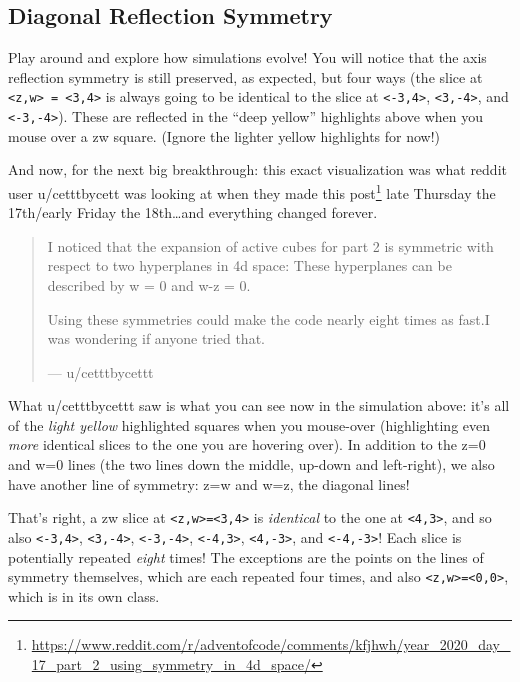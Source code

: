 \documentclass[]{article}
\renewcommand{\href}[2]{#2\footnote{\url{#1}}}
\begin{document}
\hypertarget{diagonal-reflection-symmetry}{%
\subsection{Diagonal Reflection Symmetry}\label{diagonal-reflection-symmetry}}

Play around and explore how simulations evolve! You will notice that the axis
reflection symmetry is still preserved, as expected, but four ways (the slice at
\texttt{\textless{}z,w\textgreater{}\ =\ \textless{}3,4\textgreater{}} is always
going to be identical to the slice at \texttt{\textless{}-3,4\textgreater{}},
\texttt{\textless{}3,-4\textgreater{}}, and
\texttt{\textless{}-3,-4\textgreater{}}). These are reflected in the ``deep
yellow'' highlights above when you mouse over a zw square. (Ignore the lighter
yellow highlights for now!)

And now, for the next big breakthrough: this exact visualization was what reddit
user u/cetttbycett was looking at when
\href{https://www.reddit.com/r/adventofcode/comments/kfjhwh/year_2020_day_17_part_2_using_symmetry_in_4d_space/}{they
made this post} late Thursday the 17th/early Friday the 18th\ldots and
everything changed forever.

\begin{quote}
I noticed that the expansion of active cubes for part 2 is symmetric with
respect to two hyperplanes in 4d space: These hyperplanes can be described by w
= 0 and w-z = 0.

Using these symmetries could make the code nearly eight times as fast.I was
wondering if anyone tried that.

--- u/cetttbycettt
\end{quote}

What u/cetttbycettt saw is what you can see now in the simulation above: it's
all of the \emph{light yellow} highlighted squares when you mouse-over
(highlighting even \emph{more} identical slices to the one you are hovering
over). In addition to the z=0 and w=0 lines (the two lines down the middle,
up-down and left-right), we also have another line of symmetry: z=w and w=z, the
diagonal lines!

That's right, a zw slice at
\texttt{\textless{}z,w\textgreater{}=\textless{}3,4\textgreater{}} is
\emph{identical} to the one at \texttt{\textless{}4,3\textgreater{}}, and so
also \texttt{\textless{}-3,4\textgreater{}},
\texttt{\textless{}3,-4\textgreater{}}, \texttt{\textless{}-3,-4\textgreater{}},
\texttt{\textless{}-4,3\textgreater{}}, \texttt{\textless{}4,-3\textgreater{}},
and \texttt{\textless{}-4,-3\textgreater{}}! Each slice is potentially repeated
\emph{eight} times! The exceptions are the points on the lines of symmetry
themselves, which are each repeated four times, and also
\texttt{\textless{}z,w\textgreater{}=\textless{}0,0\textgreater{}}, which is in
its own class.
\end{document}

